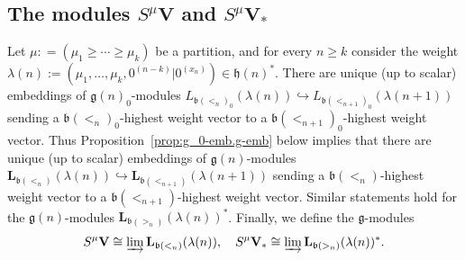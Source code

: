 \documentclass[12pt]{amsart}
\newcommand\g{\mathfrak{g}}
\newcommand\fh{\mathfrak{h}}
\newcommand\fb{\mathfrak{b}}
\newcommand\bV{\mathbf{V}}
\newcommand\bL{\mathbf{L}}
\theoremstyle{plain}
\theoremstyle{definition}
\numberwithin{equation}{section}
\begin{document}
\subsection*{The modules $S^\mu \bV$ and $S^\mu \bV_*$} 
Let $\mu : = (\mu_1\geq \cdots \geq \mu_k)$ be a partition, and for every $n\geq k$ consider the weight $\lambda(n):=(\mu_1, \ldots, \mu_k, 0^{(n-k)}|0^{(x_n)})\in \fh(n)^*$. There are unique (up to scalar) embeddings of $\g(n)_0$-modules $L_{\fb(<_n)_0}(\lambda(n))\hookrightarrow L_{\fb(<_{n+1})_0}(\lambda(n+1))$ sending a $\fb(<_n)_0$-highest weight vector to a $\fb(<_{n+1})_0$-highest weight vector. Thus Proposition~\ref{prop:g_0-emb.g-emb} below implies that there are unique (up to scalar) embeddings of $\g(n)$-modules $\bL_{\fb(<_n)}(\lambda(n))\hookrightarrow \bL_{\fb(<_{n+1})}(\lambda(n+1))$ sending a $\fb(<_n)$-highest weight vector to a $\fb(<_{n+1})$-highest weight vector. Similar statements hold for the $\g(n)$-modules $\bL_{\fb(>_n)}(\lambda(n))^*$. Finally, we define the $\g$-modules
	\[
S^\mu \bV\cong \varinjlim \bL_{\fb(<_n)}(\lambda(n)), \quad S^\mu \bV_*\cong \varinjlim \bL_{\fb(>_n)}(\lambda(n))^*.
	\]
\end{document}
